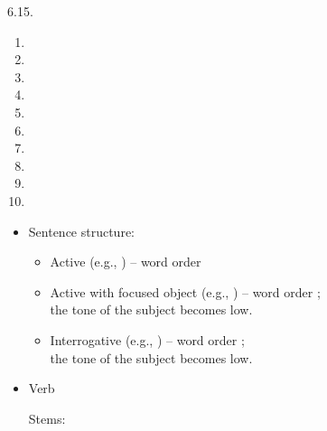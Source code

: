 \begin{refsection}
\begin{practiceproblemsolution}{6.15. \langnameDinka}
\begin{solutions}[label=Solution 6.15\alph*]
    \item \begin{enumerate}[start = 16]
                \item {}
                \item {}
                \item {}
                \item {}
                \item {}
                \item {}
                \item {}
                \item {}
                \item {}
                \item {}
        \end{enumerate}
\end{solutions}

\begin{itemize}
    \item Sentence structure:

    \begin{itemize}

        \item Active (e.g., ) – word order 
        \item Active with focused object (e.g., ) – word order ; \\ the tone of the subject becomes low.
        \item Interrogative (e.g., ) – word order ; \\the tone of the subject becomes low.
\end{itemize}
	\pagebreak
	\item Verb

 \begin{description}

     \item[Stems:] ~


\end{description}
\end{itemize}
\end{practiceproblemsolution}
\end{refsection}
